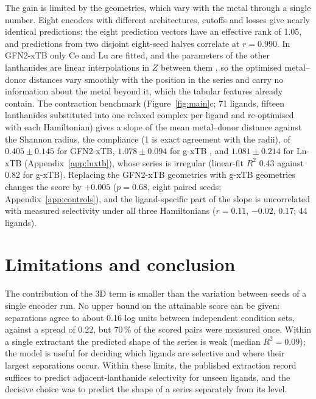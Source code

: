 The gain is limited by the geometries, which vary with the metal through a single number. Eight encoders with different architectures, cutoffs and losses give nearly identical predictions: the eight prediction vectors have an effective rank of 1.05, and predictions from two disjoint eight-seed halves correlate at $r = 0.990$. In GFN2-xTB only Ce and Lu are fitted, and the parameters of the other lanthanides are linear interpolations in $Z$ between them \citep{bannwarth2019gfn2}, so the optimised metal--donor distances vary smoothly with the position in the series and carry no information about the metal beyond it, which the tabular features already contain. The contraction benchmark (Figure~\ref{fig:main}c; 71 ligands, fifteen lanthanides substituted into one relaxed complex per ligand and re-optimised with each Hamiltonian) gives a slope of the mean metal--donor distance against the Shannon radius, the compliance \cL{} (1 is exact agreement with the radii), of $0.405 \pm 0.145$ for GFN2-xTB, $1.078 \pm 0.094$ for g-xTB \citep{gxtb}, and $1.081 \pm 0.214$ for Ln-xTB \citep{lnxtb2026} (Appendix~\ref{app:lnxtb}), whose series is irregular (linear-fit $R^2$ 0.43 against 0.82 for g-xTB). Replacing the GFN2-xTB geometries with g-xTB geometries changes the score by $+0.005$ ($p = 0.68$, eight paired seeds; Appendix~\ref{app:controls}), and the ligand-specific part of the slope is uncorrelated with measured selectivity under all three Hamiltonians ($r = 0.11$, $-0.02$, $0.17$; 44 ligands).

\section{Limitations and conclusion}
\label{sec:conclusion}
The contribution of the 3D term is smaller than the variation between seeds of a single encoder run. No upper bound on the attainable score can be given: separations agree to about 0.16 log units between independent condition sets, against a spread of 0.22, but 70\,\% of the scored pairs were measured once. Within a single extractant the predicted shape of the series is weak (median $R^2 = 0.09$); the model is useful for deciding which ligands are selective and where their largest separations occur. Within these limits, the published extraction record suffices to predict adjacent-lanthanide selectivity for unseen ligands, and the decisive choice was to predict the shape of a series separately from its level.




